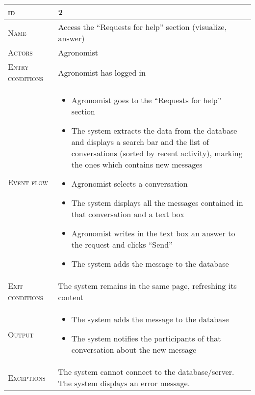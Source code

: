 \begin{table}[H]
    \centering
    \begin{tabular}[c]{|l|p{}|}
        \hline %
    	\textsc{id}                 &   2\\
    	\hline %
    	\textsc{Name}               &   Access the “Requests for help” section (visualize, answer)\\
    	\hline %
    	\textsc{Actors}             &   Agronomist\\
    	\hline %
    	\textsc{Entry conditions}   &   Agronomist has logged in\\
    	\hline %
    	\textsc{Event flow}         &   %
            	                        \begin{itemize}
                                    	    \item Agronomist goes to the “Requests for help” section
                                    		\item The system extracts the data from the database and displays a search bar and the list of conversations (sorted by recent activity), marking the ones which contains new messages
                                    		\item Agronomist selects a conversation
                                    		\item The system displays all the messages contained in that conversation and a text box
                                    		\item Agronomist writes in the text box an answer to the request and clicks “Send”
                                    		\item The system adds the message to the database
                                        \end{itemize}\\
        \hline %
        \textsc{Exit conditions}    &  The system remains in the same page, refreshing its content\\
    	\hline %
    	\textsc{Output}             &  \begin{itemize}
    	    \item The system adds the message to the database
    	    \item The system notifies the participants of that conversation about the new message
    	\end{itemize}\\
    	\hline %
    	\textsc{Exceptions}         &  The system cannot connect to the database/server. The system displays an error message.\\
    	\hline %
        

\end{tabular}
\end{table}
